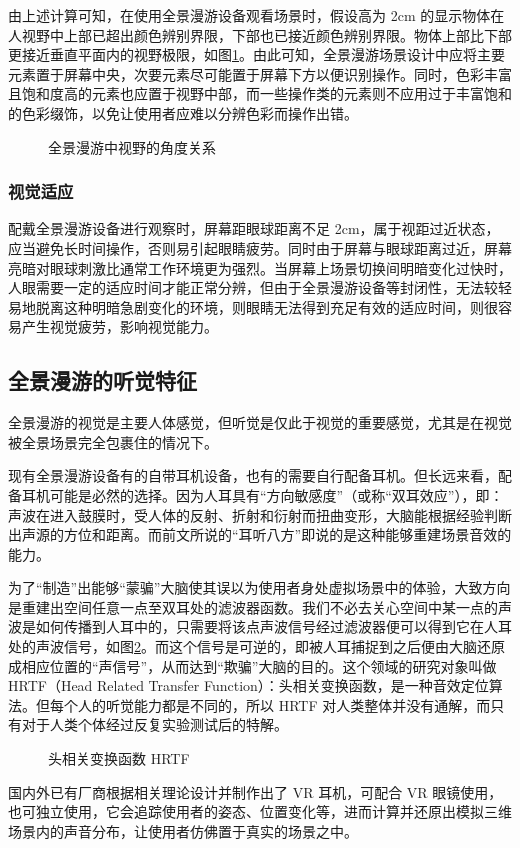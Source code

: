 由上述计算可知，在使用全景漫游设备观看场景时，假设高为 2cm 的显示物体在人视野中上部已超出颜色辨别界限，下部也已接近颜色辨别界限。物体上部比下部更接近垂直平面内的视野极限，如图\ref{fig:angle}。由此可知，全景漫游场景设计中应将主要元素置于屏幕中央，次要元素尽可能置于屏幕下方以便识别操作。同时，色彩丰富且饱和度高的元素也应置于视野中部，而一些操作类的元素则不应用过于丰富饱和的色彩缀饰，以免让使用者应难以分辨色彩而操作出错。

\begin{figure}[htp]
\centering
{}
\caption{全景漫游中视野的角度关系}
\label{fig:angle}
\end{figure}

\subsubsection{视觉适应}

配戴全景漫游设备进行观察时，屏幕距眼球距离不足 2cm，属于视距过近状态，应当避免长时间操作，否则易引起眼睛疲劳。同时由于屏幕与眼球距离过近，屏幕亮暗对眼球刺激比通常工作环境更为强烈。当屏幕上场景切换间明暗变化过快时，人眼需要一定的适应时间才能正常分辨，但由于全景漫游设备等封闭性，无法较轻易地脱离这种明暗急剧变化的环境，则眼睛无法得到充足有效的适应时间，则很容易产生视觉疲劳，影响视觉能力。

\subsection{全景漫游的听觉特征}

全景漫游的视觉是主要人体感觉，但听觉是仅此于视觉的重要感觉，尤其是在视觉被全景场景完全包裹住的情况下。

现有全景漫游设备有的自带耳机设备，也有的需要自行配备耳机。但长远来看，配备耳机可能是必然的选择。因为人耳具有“方向敏感度”（或称“双耳效应”），即：声波在进入鼓膜时，受人体的反射、折射和衍射而扭曲变形，大脑能根据经验判断出声源的方位和距离。而前文所说的“耳听八方”即说的是这种能够重建场景音效的能力。

为了“制造”出能够“蒙骗”大脑使其误以为使用者身处虚拟场景中的体验，大致方向是重建出空间任意一点至双耳处的滤波器函数。我们不必去关心空间中某一点的声波是如何传播到人耳中的，只需要将该点声波信号经过滤波器便可以得到它在人耳处的声波信号，如图\ref{fig:hrtf}。而这个信号是可逆的，即被人耳捕捉到之后便由大脑还原成相应位置的“声信号”，从而达到“欺骗”大脑的目的。这个领域的研究对象叫做 HRTF（Head Related Transfer Function）：头相关变换函数，是一种音效定位算法。但每个人的听觉能力都是不同的，所以 HRTF 对人类整体并没有通解，而只有对于人类个体经过反复实验测试后的特解。

\begin{figure}[htp]
\centering
{}
\caption{头相关变换函数 HRTF}
\label{fig:hrtf}
\end{figure}

国内外已有厂商根据相关理论设计并制作出了 VR 耳机，可配合 VR 眼镜使用，也可独立使用，它会追踪使用者的姿态、位置变化等，进而计算并还原出模拟三维场景内的声音分布，让使用者仿佛置于真实的场景之中。